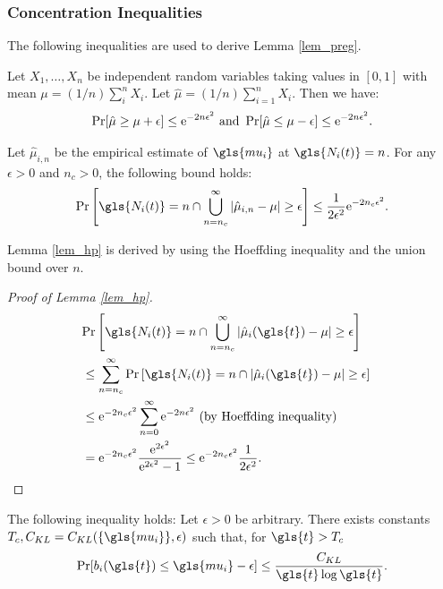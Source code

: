 \subsubsection{Concentration Inequalities}

The following inequalities are used to derive Lemma \ref{lem_preg}.

\begin{lemma}\label{hoeffdinginequality}
Let $X_1,\dots,X_n$ be independent random variables taking values in $[0,1]$ with  mean $\mu = (1/n)\sum_i^n X_i$. Let $\hat{\mu} = (1/n)\sum_{i=1}^n X_i$.
Then we have:
\begin{equation}
\Pr[\hat{\mu} \ge \mu + \epsilon] \le \mathrm{e}^{-2 n \epsilon^2} \text{ and } \Pr[\hat{\mu} \le \mu -\epsilon] \le \mathrm{e}^{-2 n \epsilon^2}.
\end{equation}
\end{lemma}

\begin{lemma}
\label{lem_hp}
Let $\hat{\mu}_{i,n}$ be the empirical estimate of $\gls{mu_i}$ at $\gls{N_i(t)}=n$.
For any $\epsilon > 0$ and $n_c > 0$, the following bound holds:
\[
\Pr\left[\gls{N_i(t)} = n \cap \bigcup_{n=n_c}^\infty |\hat{\mu}_{i,n} - \mu| \ge \epsilon\right] 
 \le \frac{1}{2 \epsilon^2} \e^{-2 n_c \epsilon^2}.
\]
\end{lemma}
Lemma \ref{lem_hp} is derived by using the Hoeffding inequality and the union bound over $n$.
\begin{proof}[Proof of Lemma \ref{lem_hp}]
\begin{align}
\lefteqn{
\Pr \left[\gls{N_i(t)} = n \cap \bigcup_{n=n_c}^\infty |\hat{\mu}_i(\gls{t}) - \mu| \ge \epsilon \right] 
}\nn
&\le \sum_{n=n_c}^\infty \Pr\left[\gls{N_i(t)} = n \cap |\hat{\mu}_i(\gls{t}) - \mu| \ge \epsilon\right] \nn
&\le \e^{-2 n_c \epsilon^2} \sum_{n=0}^\infty \e^{-2 n \epsilon^2}\ \text{(by Hoeffding inequality)}\nn
&= \e^{-2 n_c \epsilon^2} \frac{\e^{2 \epsilon^2}}{\e^{2 \epsilon^2} - 1} \le \e^{-2 n_c \epsilon^2} \frac{1}{2 \epsilon^2}. \qedhere
\end{align} 
\end{proof}

\begin{lemma}
\label{lem_underest}
The following inequality holds:
Let $\epsilon > 0$ be arbitrary. There exists constants $T_c, C_{KL} = C_{KL}(\{\gls{mu_i}\},\epsilon)$ such that, for $\gls{t} > T_c$
\begin{equation}
\Pr[ b_i(\gls{t}) \le \gls{mu_i} - \epsilon ] \le \frac{C_{KL}}{\gls{t} \log \gls{t}}.
\end{equation}
\end{lemma}

